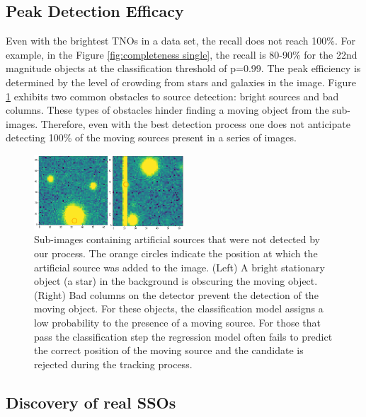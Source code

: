\subsection{Peak Detection Efficacy}
\label{subsect: Peak Detection Efficacy}

Even with the brightest TNOs in a data set, the recall does not reach 100\%.
For example, in the Figure \ref{fig:completeness single}, the recall is 80-90\% for the 22nd magnitude objects at the classification threshold of p=0.99.
The peak efficiency is determined by the level of crowding from stars and galaxies in the image.
Figure \ref{fig:obstacles} exhibits two common obstacles to source detection: bright sources and bad columns.
These types of obstacles hinder finding a moving object from the sub-images.
Therefore, even with the best detection process one does not anticipate detecting 100\% of the moving sources present in a series of images.

\begin{figure}[htb]
    \centering
    \includegraphics[width=0.5\textwidth,keepaspectratio]{Figures/obstacles.png}
    \caption{Sub-images containing artificial sources that were not detected by our process.
    The orange circles indicate the position at which the artificial source was added to the image.
    (Left) A bright stationary object (a star) in the background is obscuring the moving object.  
    (Right) Bad columns on the detector prevent the detection of the moving object.
    For these objects, the classification model assigns a low probability to the presence of a moving source.  
    For those that pass the classification step the regression model often fails to predict the correct position of the moving source and the candidate is rejected during the tracking process.
}
    \label{fig:obstacles}
\end{figure}

\subsection{Discovery of real SSOs}
\label{subsect:Discovery of real SSOs}

